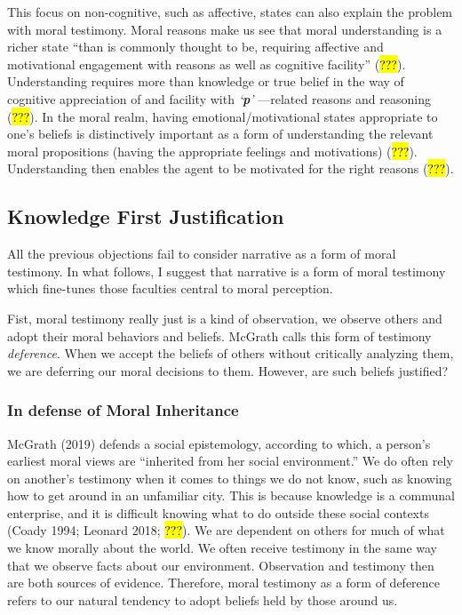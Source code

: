 \documentclass[
  letterpaper,
  DIV=11,
  numbers=noendperiod]{scrartcl}
\theoremstyle{remark}
\begin{document}
This focus on non-cognitive, such as affective, states can also explain
the problem with moral testimony. Moral reasons make us see that moral
understanding is a richer state ``than is commonly thought to be,
requiring affective and motivational engagement with reasons as well as
cognitive facility'' (\hl{???}). Understanding requires more than
knowledge or true belief in the way of cognitive appreciation of and
facility with \emph{`\textbf{p}'} ---related reasons and reasoning
(\hl{???}). In the moral realm, having emotional/motivational states
appropriate to one's beliefs is distinctively important as a form of
understanding the relevant moral propositions (having the appropriate
feelings and motivations) (\hl{???}). Understanding then enables the
agent to be motivated for the right reasons (\hl{???}).

\subsection{Knowledge First
Justification}\label{knowledge-first-justification}

All the previous objections fail to consider narrative as a form of
moral testimony. In what follows, I suggest that narrative is a form of
moral testimony which fine-tunes those faculties central to moral
perception.

Fist, moral testimony really just is a kind of observation, we observe
others and adopt their moral behaviors and beliefs. McGrath calls this
form of testimony \emph{deference}. When we accept the beliefs of others
without critically analyzing them, we are deferring our moral decisions
to them. However, are such beliefs justified?

\subsubsection{In defense of Moral
Inheritance}\label{in-defense-of-moral-inheritance-1}

McGrath (2019) defends a social epistemology, according to which, a
person's earliest moral views are ``inherited from her social
environment.'' We do often rely on another's testimony when it comes to
things we do not know, such as knowing how to get around in an
unfamiliar city. This is because knowledge is a communal enterprise, and
it is difficult knowing what to do outside these social contexts (Coady
1994; Leonard 2018; \hl{???}). We are dependent on others for much of
what we know morally about the world. We often receive testimony in the
same way that we observe facts about our environment. Observation and
testimony then are both sources of evidence. Therefore, moral testimony
as a form of deference refers to our natural tendency to adopt beliefs
held by those around us.
\end{document}
